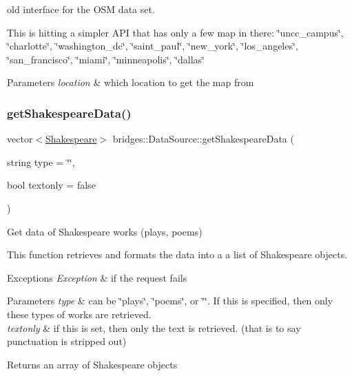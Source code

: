 old interface for the O\+SM data set. 

This is hitting a simpler A\+PI that has only a few map in there\+: \char`\"{}uncc\+\_\+campus\char`\"{}, \char`\"{}charlotte\char`\"{}, \char`\"{}washington\+\_\+dc\char`\"{}, \char`\"{}saint\+\_\+paul\char`\"{}, \char`\"{}new\+\_\+york\char`\"{}, \char`\"{}los\+\_\+angeles\char`\"{}, \char`\"{}san\+\_\+francisco\char`\"{}, \char`\"{}miami\char`\"{}, \char`\"{}minneapolis\char`\"{}, \char`\"{}dallas\char`\"{}


\begin{DoxyParams}{Parameters}
{\em location} & which location to get the map from \\
\hline
\end{DoxyParams}
\mbox{\label{classbridges_1_1_data_source_a8b73299a4c1c71d2e32431a8d4a7be81}} 
\subsubsection{\texorpdfstring{getShakespeareData()}{getShakespeareData()}}
{\footnotesize\ttfamily vector$<$\mbox{\hyperlink{classbridges_1_1dataset_1_1_shakespeare}{Shakespeare}}$>$ bridges\+::\+Data\+Source\+::get\+Shakespeare\+Data (\begin{DoxyParamCaption}\item[{string}]{type = {\ttfamily \char`\"{}\char`\"{}},  }\item[{bool}]{textonly = {\ttfamily false} }\end{DoxyParamCaption})\hspace{0.3cm}{\ttfamily [inline]}}



Get data of Shakespeare works (plays, poems) 

This function retrieves and formats the data into a a list of Shakespeare objects.


\begin{DoxyExceptions}{Exceptions}
{\em Exception} & if the request fails\\
\hline
\end{DoxyExceptions}

\begin{DoxyParams}{Parameters}
{\em type} & can be \char`\"{}plays\char`\"{}, \char`\"{}poems\char`\"{}, or \char`\"{}\char`\"{}. If this is specified, then only these types of works are retrieved. \\
\hline
{\em textonly} & if this is set, then only the text is retrieved. (that is to say punctuation is stripped out)\\
\hline
\end{DoxyParams}
\begin{DoxyReturn}{Returns}
an array of Shakespeare objects 
\end{DoxyReturn}
\mbox{\label{classbridges_1_1_data_source_a284c9d572415b67df6989ab8ab97d0e2}} 
